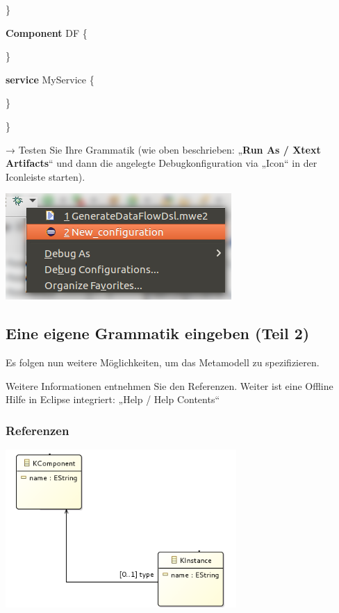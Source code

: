 \documentclass[]{article}
\begin{document}
\}

\textbf{Component} DF \{

\}

\textbf{service} MyService \{

\}

\}

→ Testen Sie Ihre Grammatik (wie oben beschrieben: „\textbf{Run As /
Xtext Artifacts}`` und dann die angelegte Debugkonfiguration via „Icon``
in der Iconleiste starten).

\includegraphics[width=3.38540in,height=1.59370in]{./Pictures/100002010000014500000099ABA38A95A85F29E5.png}

\subsection[Eine eigene Grammatik eingeben (Teil
2)]{\texorpdfstring{\protect\hypertarget{anchor-23}{}{}Eine eigene
Grammatik eingeben (Teil
2)}{Eine eigene Grammatik eingeben (Teil 2)}}\label{eine-eigene-grammatik-eingeben-teil-2}

Es folgen nun weitere Möglichkeiten, um das Metamodell zu spezifizieren.

Weitere Informationen entnehmen Sie den Referenzen. Weiter ist eine
Offline Hilfe in Eclipse integriert: „Help / Help Contents``

\subsubsection[Referenzen]{\texorpdfstring{\protect\hypertarget{anchor-24}{}{}Referenzen}{Referenzen}}\label{referenzen}

\includegraphics[width=3.45830in,height=2.35830in]{./Pictures/100002010000019F0000011B523F6AF86839FE43.png}
\end{document}
